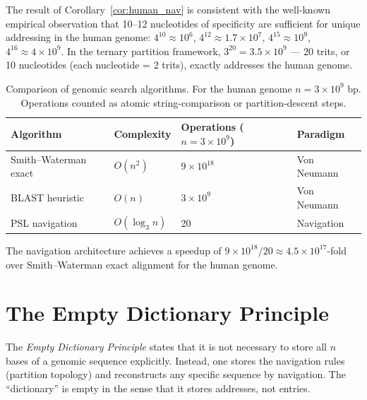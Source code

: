 \begin{remark}
The result of Corollary~\ref{cor:human_nav} is consistent with the
well-known empirical observation that 10--12 nucleotides of specificity
are sufficient for unique addressing in the human genome:
$4^{10} \approx 10^6$, $4^{12} \approx 1.7\times 10^7$,
$4^{15} \approx 10^9$, $4^{16} \approx 4\times 10^9$.
In the ternary partition framework, $3^{20} = 3.5\times 10^9$ ---
20 trits, or 10 nucleotides (each nucleotide = 2 trits),
exactly addresses the human genome.
\end{remark}

\begin{table}[htbp]
\centering
\caption{Comparison of genomic search algorithms. For the human genome
$n = 3\times 10^9$ bp. Operations counted as atomic string-comparison
or partition-descent steps.}
\label{tab:complexity_comparison}
\begin{tabular}{llll}
\toprule
Algorithm & Complexity & Operations ($n = 3\times 10^9$) & Paradigm \\
\midrule
Smith--Waterman exact     & $O(n^2)$       & $9\times 10^{18}$ & Von Neumann \\
BLAST heuristic           & $O(n)$         & $3\times 10^9$    & Von Neumann \\
PSL navigation            & $O(\log_3 n)$  & 20                & Navigation \\
\bottomrule
\end{tabular}
\end{table}

The navigation architecture achieves a speedup of $9\times 10^{18} / 20
\approx 4.5\times 10^{17}$-fold over Smith--Waterman exact alignment
for the human genome.

\section{The Empty Dictionary Principle}
\label{sec:empty_dictionary}

\begin{definition}
\label{def:empty_dictionary}
The \emph{Empty Dictionary Principle} states that it is not necessary
to store all $n$ bases of a genomic sequence explicitly. Instead, one
stores the navigation rules (partition topology) and reconstructs any
specific sequence by navigation. The ``dictionary'' is empty in the sense
that it stores addresses, not entries.
\end{definition}


